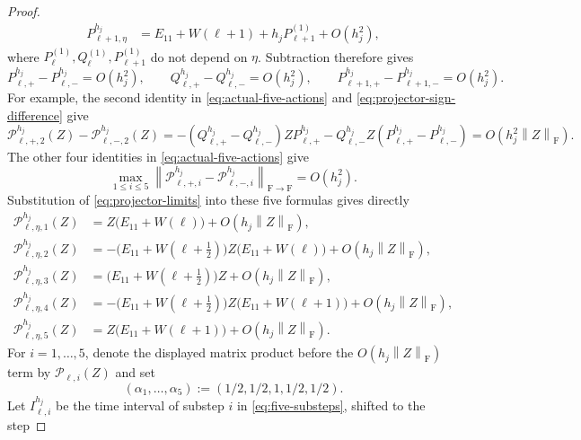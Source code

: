 \documentclass[]{article}
\numberwithin{equation}{section}
\theoremstyle{plain}
\theoremstyle{remark}
\newcommand{\F}{\mathrm F}
\newcommand{\norm}[1]{\left\lVert #1\right\rVert}
\begin{document}
\begin{proof}
\begin{align*}
 P^{h_j}_{\ell+1,\eta}
 &=E_{11}+W(\ell+1)+h_jP^{(1)}_{\ell+1}+O(h_j^2),
\end{align*}
where \(P^{(1)}_{\ell},Q^{(1)}_{\ell},P^{(1)}_{\ell+1}\) do not
depend on \(\eta\).  Subtraction therefore gives
\begin{equation}\label{eq:projector-sign-difference}
 P^{h_j}_{\ell,+}-P^{h_j}_{\ell,-}=O(h_j^2),\qquad
 Q^{h_j}_{\ell,+}-Q^{h_j}_{\ell,-}=O(h_j^2),\qquad
 P^{h_j}_{\ell+1,+}-P^{h_j}_{\ell+1,-}=O(h_j^2).
\end{equation}
For example, the second identity in
\eqref{eq:actual-five-actions} and
\eqref{eq:projector-sign-difference} give
\[
 \mathcal P^{h_j}_{\ell,+,2}(Z)-\mathcal P^{h_j}_{\ell,-,2}(Z)
 =-(Q^{h_j}_{\ell,+}-Q^{h_j}_{\ell,-})
 ZP^{h_j}_{\ell,+}
 -Q^{h_j}_{\ell,-}Z
 (P^{h_j}_{\ell,+}-P^{h_j}_{\ell,-})
 =O(h_j^2\norm Z_{\F}).
\]
The other four identities in \eqref{eq:actual-five-actions} give
\begin{equation}\label{eq:action-sign-difference}
 \max_{1\le i\le5}
 \norm{\mathcal P^{h_j}_{\ell,+,i}
       -\mathcal P^{h_j}_{\ell,-,i}}_{\F\to\F}
 =O(h_j^2).
\end{equation}
Substitution of \eqref{eq:projector-limits} into these five formulas
gives directly
\begin{equation}\label{eq:five-actions}
\begin{aligned}
 \mathcal P^{h_j}_{\ell,\eta,1}(Z)
 &=Z\bigl(E_{11}+W(\ell)\bigr)+O(h_j\norm Z_{\F}),\\
 \mathcal P^{h_j}_{\ell,\eta,2}(Z)
 &=-\bigl(E_{11}+W(\ell+\tfrac12)\bigr)
 Z\bigl(E_{11}+W(\ell)\bigr)+O(h_j\norm Z_{\F}),\\
 \mathcal P^{h_j}_{\ell,\eta,3}(Z)
 &=\bigl(E_{11}+W(\ell+\tfrac12)\bigr)Z
 +O(h_j\norm Z_{\F}),\\
 \mathcal P^{h_j}_{\ell,\eta,4}(Z)
 &=-\bigl(E_{11}+W(\ell+\tfrac12)\bigr)
 Z\bigl(E_{11}+W(\ell+1)\bigr)+O(h_j\norm Z_{\F}),\\
 \mathcal P^{h_j}_{\ell,\eta,5}(Z)
 &=Z\bigl(E_{11}+W(\ell+1)\bigr)+O(h_j\norm Z_{\F}).
\end{aligned}
\end{equation}
For $i=1,\ldots,5$, denote the displayed matrix product before the
$O(h_j\norm Z_{\F})$ term by $\mathcal P_{\ell,i}(Z)$ and set
\begin{equation}\label{eq:substep-lengths}
 (\alpha_1,\ldots,\alpha_5):=(1/2,1/2,1,1/2,1/2).
\end{equation}
Let $I^{h_j}_{\ell,i}$ be the time interval of substep $i$ in
\eqref{eq:five-substeps}, shifted to the step

\end{proof}
\end{document}
